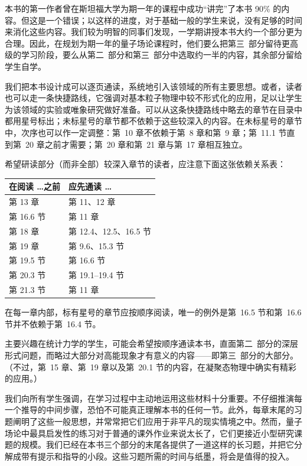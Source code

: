 本书的第一作者曾在斯坦福大学为期一年的课程中成功``讲完''了本书 90\% 的内容。但这是一个错误；以这样的进度，对于基础一般的学生来说，没有足够的时间来消化这些内容。我们较为明智的同事们发现，一学期讲授本书大约一个部分更为合理。因此，在规划为期一年的量子场论课程时，他们要么把第三~部分留待更高级的学习阶段，要么从第二~部分和第三~部分中选取约一半的内容，其余部分留给学生自学。

我们把本书设计成可以逐页通读，系统地引入该领域的所有主要思想。或者，读者也可以走一条快捷路线，它强调对基本粒子物理中较不形式化的应用，足以让学生为该领域的实验或唯象研究做好准备。可以从这条快捷路线中略去的章节在目录中都用星号标出；未标星号的章节都不依赖于这些较深入的内容。在未标星号的章节中，次序也可以作一定调整：第~10 章不依赖于第~8 章和第~9 章；第~11.1 节直到第~20 章之前才需要；第~20 章和第~21 章与第~17 章相互独立。

希望研读部分（而非全部）较深入章节的读者，应注意下面这张依赖关系表：
\begin{center}
\begin{tabular}{ll}
\toprule
在阅读 \ldots 之前 & 应先通读 \ldots\\
\midrule
第 13 章            & 第 11、12 章\\
第 16.6 节          & 第 11 章\\
第 18 章            & 第 12.4、12.5、16.5 节\\
第 19 章            & 第 9.6、15.3 节\\
第 19.5 节          & 第 16.6 节\\
第 20.3 节          & 第 19.1--19.4 节\\
第 21.3 节          & 第 11 章\\
\bottomrule
\end{tabular}
\end{center}

在每一章内部，标有星号的章节应按顺序阅读，唯一的例外是第~16.5 节和第~16.6 节并不依赖于第~16.4 节。

主要兴趣在统计力学的学生，可能会希望按顺序通读本书，直面第二~部分的深层形式问题，而略过大部分对高能现象才有意义的内容——即第三~部分的大部分。（不过，第~15 章、第~19 章以及第~20.1 节的内容，在凝聚态物理中确实有精彩的应用。）

我们向所有学生强调，在学习过程中主动地运用这些材料十分重要。不仔细推演每一个推导的中间步骤，恐怕不可能真正理解本书的任何一节。此外，每章末尾的习题阐明了这些一般思想，并常常把它们应用于非平凡的现实情境之中。然而，量子场论中最具启发性的练习对于普通的课外作业来说太长了，它们更接近小型研究课题的规模。我们已经在本书三个部分的末尾各提供了一道这样的长习题，并把它分解成带有提示和指导的小段。这些习题所需的时间与纸墨，将会是值得的投入。

